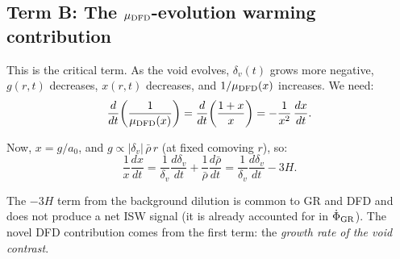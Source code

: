 \documentclass[11pt,a4paper]{article}
\newcommand{\aM}{a_0}
\newcommand{\mufd}{\mu_{\rm DFD}}
\begin{document}
\subsection{Term B: The $\mufd$-evolution warming contribution}
\label{sec:term-B}

This is the critical term. As the void evolves, $\delta_v(t)$
grows more negative, $g(r,t)$ decreases, $x(r,t)$ decreases, and
$1/\mufd(x)$ increases. We need:
\begin{equation}
\frac{d}{dt}\!\left(\frac{1}{\mufd(x)}\right)
= \frac{d}{dt}\!\left(\frac{1+x}{x}\right)
= -\frac{1}{x^2}\,\frac{dx}{dt}.
\label{eq:dmu-dt}
\end{equation}

Now, $x = g/\aM$, and $g \propto |\delta_v|\,\bar{\rho}\,r$ (at fixed
comoving $r$), so:
\begin{equation}
\frac{1}{x}\frac{dx}{dt}
= \frac{1}{\delta_v}\frac{d\delta_v}{dt}
+ \frac{1}{\bar{\rho}}\frac{d\bar{\rho}}{dt}
= \frac{1}{\delta_v}\frac{d\delta_v}{dt} - 3H.
\label{eq:xdot}
\end{equation}

The $-3H$ term from the background dilution is common to GR and DFD
and does not produce a net ISW signal (it is already accounted for in
$\dot{\Phi}_{\rm GR}$). The novel DFD contribution comes from the
first term: the \emph{growth rate of the void contrast}.
\end{document}
